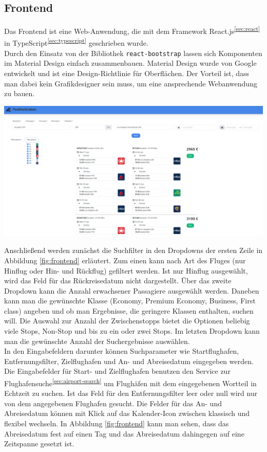 \documentclass[12pt,twoside,a4paper]{article}
\begin{document}
\begin{sloppypar}
\subsection{Frontend}
Das Frontend ist eine Web-Anwendung, die mit dem Framework React.js\textsuperscript{\ref{sec:react}} in TypeScript\textsuperscript{\ref{sec:typescript}} geschrieben wurde.\\
Durch den Einsatz von der Bibliothek \texttt{react-bootstrap} lassen sich Komponenten im Material Design einfach zusammenbauen. Material Design wurde von Google entwickelt und ist eine Design-Richtlinie für Oberflächen. Der Vorteil ist, dass man dabei kein Grafikdesigner sein muss, um eine ansprechende Webanwendung zu bauen.
\begin{center}
	\captionsetup{type=figure}
	\includegraphics[width=\textwidth]{images/frontend-screenshot}
	\label{fig:frontend}
\end{center}
Anschließend werden zunächst die Suchfilter in den Dropdowns der ersten Zeile in Abbildung \ref{fig:frontend} erläutert. Zum einen kann nach Art des Fluges (nur Hinflug oder Hin- und Rückflug) gefiltert werden. Ist nur Hinflug ausgewählt, wird das Feld für das Rückreisedatum nicht dargestellt. Über das zweite Dropdown kann die Anzahl erwachsener Passagiere ausgewählt werden. Daneben kann man die gewünschte Klasse (Economy, Premium Economy, Business, First class) angeben und ob man Ergebnisse, die geringere Klassen enthalten, suchen will. Die Auswahl zur Anzahl der Zwischenstopps bietet die Optionen beliebig viele Stops, Non-Stop und bis zu ein oder zwei Stops. Im letzten Dropdown kann man die gewünschte Anzahl der Suchergebnisse auswählen.\\
In den Eingabefeldern darunter können Suchparameter wie Startflughafen, Entfernungsfilter, Zielflughafen und An- und Abreisedatum eingegeben werden. Die Eingabefelder für Start- und Zielflughafen benutzen den Service zur Flughafensuche\textsuperscript{\ref{sec:airport-search}} um Flughäfen mit dem eingegebenen Wortteil in Echtzeit zu suchen. Ist das Feld für den Entfernungsfilter leer oder null wird nur von dem angegebenen Flughafen gesucht. Die Felder für das An- und Abreisedatum können mit Klick auf das Kalender-Icon zwischen klassisch und flexibel wechseln. In Abbildung \ref{fig:frontend} kann man sehen, dass das Abreisedatum fest auf einen Tag und das Abreisedatum dahingegen auf eine Zeitspanne gesetzt ist.\\

\end{sloppypar}
\end{document}
